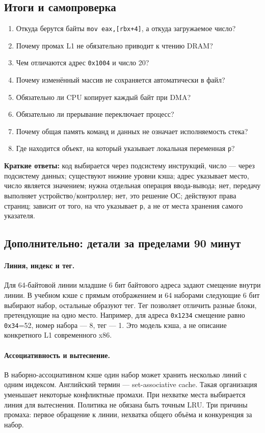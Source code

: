 \subsection*{Итоги и самопроверка}
\begin{enumerate}
\item Откуда берутся байты \texttt{mov eax,[rbx+4]}, а откуда загружаемое число?
\item Почему промах L1 не обязательно приводит к чтению DRAM?
\item Чем отличаются адрес \texttt{0x1004} и число 20?
\item Почему изменённый массив не сохраняется автоматически в файл?
\item Обязательно ли CPU копирует каждый байт при DMA?
\item Обязательно ли прерывание переключает процесс?
\item Почему общая память команд и данных не означает исполняемость стека?
\item Где находится объект, на который указывает локальная переменная \texttt{p}?
\end{enumerate}
\textbf{Краткие ответы:} код выбирается через подсистему инструкций, число ---
через подсистему данных; существуют нижние уровни кэша; адрес указывает место,
число является значением; нужна отдельная операция ввода-вывода; нет,
передачу выполняет устройство/контроллер; нет, это решение ОС; действуют
права страниц; зависит от того, на что указывает \texttt{p}, а не от
места хранения самого указателя.

\newpage
\subsection{Дополнительно: детали за пределами 90 минут}
\paragraph{Линия, индекс и тег.}
Для 64-байтовой линии младшие 6 бит байтового адреса задают смещение внутри
линии. В учебном кэше с прямым отображением и 64 наборами следующие 6 бит
выбирают набор, остальные образуют тег. Тег позволяет отличить разные
блоки, претендующие на одно место. Например, для адреса \texttt{0x1234}
смещение равно \texttt{0x34}=52, номер набора --- 8, тег --- 1.
Это модель кэша, а не описание конкретного L1 современного x86.

\paragraph{Ассоциативность и вытеснение.}
В наборно-ассоциативном кэше один набор может хранить несколько
линий с одним индексом. Английский термин --- set-associative cache.
Такая организация уменьшает некоторые конфликтные промахи.
При нехватке места выбирается линия для вытеснения. Политика не обязана
быть точным LRU. Три причины промаха: первое обращение к линии,
нехватка общего объёма и конкуренция за набор.

